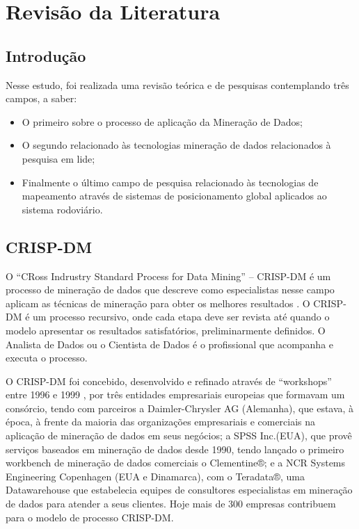 \chapter{Revisão da Literatura}\label{arte}


\section{Introdução}\label{arte:intro}

Nesse estudo, foi realizada uma revisão teórica e de pesquisas contemplando três campos, a saber: 
  \begin{itemize}
    \item O primeiro sobre o processo de aplicação da Mineração de Dados;
    \item O segundo relacionado às tecnologias mineração de dados relacionados à pesquisa em lide;
    \item Finalmente o último campo de pesquisa relacionado às tecnologias de mapeamento através de sistemas de posicionamento global 
    aplicados ao sistema rodoviário.
  \end{itemize}


  
\section{CRISP-DM}

O ``CRoss Indrustry Standard Process for Data Mining'' -- CRISP-DM é um processo de mineração de dados que descreve como especialistas 
nesse campo aplicam as técnicas de mineração para obter os melhores resultados \cite{Crisp2000}.
O CRISP-DM é um processo recursivo, onde cada etapa deve ser revista até quando o modelo apresentar os resultados satisfatórios, preliminarmente definidos.
O Analista de Dados ou o Cientista de Dados é o profissional que acompanha e executa o processo.

O CRISP-DM foi concebido, desenvolvido e refinado através de ``workshops'' entre 1996 e 1999 \cite{Crisp2000}, por três entidades empresariais europeias que 
formavam um consórcio, tendo com parceiros a Daimler-Chrysler AG (Alemanha), que estava, à época, à frente da maioria das organizações empresariais e comerciais 
na aplicação de mineração de dados em seus negócios; 
a SPSS Inc.(EUA), que provê serviços baseados em mineração de dados desde 1990, tendo lançado o primeiro workbench de mineração 
de dados comerciais o Clementine®; 
e a NCR Systems Engineering Copenhagen (EUA e Dinamarca), com o Teradata®, uma Datawarehouse que estabelecia equipes de consultores especialistas em mineração 
de dados para atender a seus clientes. Hoje mais de 300 empresas contribuem para o modelo de processo CRISP-DM.

